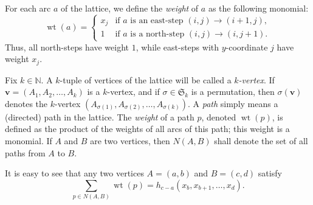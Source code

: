 \documentclass[reqno]{amsart}
\newcommand{\0}{\phantom{c}}
\newcommand{\SymGp}[1]{\mathfrak{S}_{#1}} %
\DeclareMathOperator{\wt}{wt} %
\newcommand{\vv}{\mathbf{v}}
\newcommand{\NN}{\mathbb{N}}
\let\sumnonlimits\sum
\renewcommand{\sum}{\sumnonlimits\limits}
\newenvironment{verlong}{}{}
\newcommand{\set}[1]{\left\{ #1 \right\}}
\newcommand{\tup}[1]{\left( #1 \right)}
\newcommand{\defn}[1]{{\color{darkred}\emph{#1}}} %
\theoremstyle{plain}
\theoremstyle{definition}
\numberwithin{equation}{section}
\begin{document}
For each arc $a$ of the lattice, we define the \defn{weight} of $a$ as the following monomial:
\[
\wt(a) = \begin{cases}
x_j & \text{if $a$ is an east-step } (i,j) \to (i+1,j), \\
1 & \text{if $a$ is a north-step } (i,j) \to (i,j+1).
\end{cases}
\]
Thus, all north-steps have weight $1$, while east-steps with $y$-coordinate $j$ have weight $x_j$.

Fix $k \in \NN$.
A $k$-tuple of vertices of the lattice will be called a \defn{$k$-vertex}.
\begin{verlong}
If $\vv = \tup{A_1, A_2, \dotsc, A_k}$ is a $k$-vertex, and if $\sigma \in \SymGp{k}$ is a permutation, then $\sigma(\vv)$ denotes the $k$-vertex $\tup{A_{\sigma(1)}, A_{\sigma(2)}, \dotsc, A_{\sigma(k)}}$.
\end{verlong}
A \defn{path} simply means a (directed) path in the lattice.
The \defn{weight} of a path $p$, denoted $\wt(p)$, is defined as the product of the weights of all arcs of this path; this weight is a monomial.
If $A$ and $B$ are two vertices, then \defn{$N(A,B)$} shall denote the set of all paths from $A$ to $B$.

It is easy to see that any two vertices $A = (a,b)$ and $B = (c,d)$ satisfy
\begin{equation}
\label{eq.LGV.single-paths}
\sum_{p \in N(A,B)} \wt(p) = h_{c-a}(x_{b}, x_{b+1}, \dotsc, x_{d}).
\end{equation}
\end{document}
